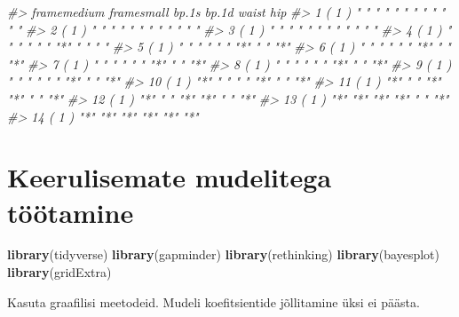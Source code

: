 \documentclass[]{book}
\newenvironment{Shaded}{\begin{snugshade}}{\end{snugshade}}
\newcommand{\KeywordTok}[1]{\textcolor[rgb]{0.13,0.29,0.53}{\textbf{#1}}}
\newcommand{\DataTypeTok}[1]{\textcolor[rgb]{0.13,0.29,0.53}{#1}}
\newcommand{\DecValTok}[1]{\textcolor[rgb]{0.00,0.00,0.81}{#1}}
\newcommand{\StringTok}[1]{\textcolor[rgb]{0.31,0.60,0.02}{#1}}
\newcommand{\CommentTok}[1]{\textcolor[rgb]{0.56,0.35,0.01}{\textit{#1}}}
\newcommand{\OperatorTok}[1]{\textcolor[rgb]{0.81,0.36,0.00}{\textbf{#1}}}
\newcommand{\NormalTok}[1]{#1}
\begin{document}
\begin{Shaded}
\begin{Highlighting}[]
\CommentTok{#>           framemedium framesmall bp.1s bp.1d waist hip}
\CommentTok{#> 1  ( 1 )  " "         " "        " "   " "   " "   " "}
\CommentTok{#> 2  ( 1 )  " "         " "        " "   " "   " "   " "}
\CommentTok{#> 3  ( 1 )  " "         " "        " "   " "   " "   " "}
\CommentTok{#> 4  ( 1 )  " "         " "        " "   "*"   " "   " "}
\CommentTok{#> 5  ( 1 )  " "         " "        " "   "*"   " "   "*"}
\CommentTok{#> 6  ( 1 )  " "         " "        " "   "*"   " "   "*"}
\CommentTok{#> 7  ( 1 )  " "         " "        " "   "*"   " "   "*"}
\CommentTok{#> 8  ( 1 )  " "         " "        " "   "*"   " "   "*"}
\CommentTok{#> 9  ( 1 )  " "         " "        " "   "*"   " "   "*"}
\CommentTok{#> 10  ( 1 ) "*"         " "        " "   "*"   " "   "*"}
\CommentTok{#> 11  ( 1 ) "*"         " "        "*"   "*"   " "   "*"}
\CommentTok{#> 12  ( 1 ) "*"         " "        "*"   "*"   " "   "*"}
\CommentTok{#> 13  ( 1 ) "*"         "*"        "*"   "*"   " "   "*"}
\CommentTok{#> 14  ( 1 ) "*"         "*"        "*"   "*"   "*"   "*"}
\end{Highlighting}
\end{Shaded}

\chapter{Keerulisemate mudelitega
töötamine}\label{keerulisemate-mudelitega-tootamine}

\begin{Shaded}
\begin{Highlighting}[]
\KeywordTok{library}\NormalTok{(tidyverse)}
\KeywordTok{library}\NormalTok{(gapminder)}
\KeywordTok{library}\NormalTok{(rethinking)}
\KeywordTok{library}\NormalTok{(bayesplot)}
\KeywordTok{library}\NormalTok{(gridExtra)}
\end{Highlighting}
\end{Shaded}

Kasuta graafilisi meetodeid. Mudeli koefitsientide jõllitamine üksi ei
päästa.

\begin{Shaded}
\end{Shaded}
\end{document}
